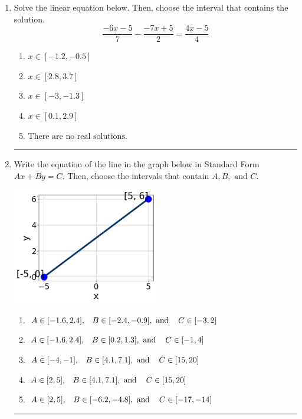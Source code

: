 \documentclass[14pt]{extbook}
\newcommand{\litem}[1]{\item#1\hspace*{-1cm}\rule{\textwidth}{0.4pt}}
\begin{document}
\begin{enumerate}
{\begin{enumerate}[label=\Alph*.]
\end{enumerate} }
\litem{
Solve the linear equation below. Then, choose the interval that contains the solution.\[ \frac{-6x -5}{7} - \frac{-7x + 5}{2} = \frac{4x -5}{4} \]\begin{enumerate}[label=\Alph*.]
\item \( x \in [-1.2, -0.5] \)
\item \( x \in [2.8, 3.7] \)
\item \( x \in [-3, -1.3] \)
\item \( x \in [0.1, 2.9] \)
\item \( \text{There are no real solutions.} \)

\end{enumerate} }
\litem{
Write the equation of the line in the graph below in Standard Form $Ax+By=C$. Then, choose the intervals that contain $A, B, \text{ and } C$.
\begin{center}
    \includegraphics[width=0.5\textwidth]{../Figures/linearGraphToStandardCopyA.png}
\end{center}
\begin{enumerate}[label=\Alph*.]
\item \( A \in [-1.6, 2.4], \hspace{3mm} B \in [-2.4, -0.9], \text{ and } \hspace{3mm} C \in [-3, 2] \)
\item \( A \in [-1.6, 2.4], \hspace{3mm} B \in [0.2, 1.3], \text{ and } \hspace{3mm} C \in [-1, 4] \)
\item \( A \in [-4, -1], \hspace{3mm} B \in [4.1, 7.1], \text{ and } \hspace{3mm} C \in [15, 20] \)
\item \( A \in [2, 5], \hspace{3mm} B \in [4.1, 7.1], \text{ and } \hspace{3mm} C \in [15, 20] \)
\item \( A \in [2, 5], \hspace{3mm} B \in [-6.2, -4.8], \text{ and } \hspace{3mm} C \in [-17, -14] \)


\end{enumerate}}
\end{enumerate}
\end{document}
